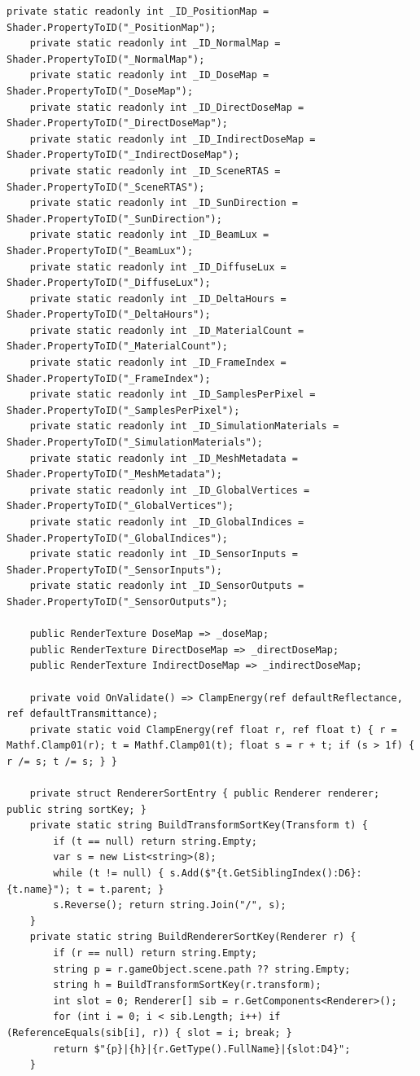 \begin{lstlisting}[language={[Sharp]C}, caption={IrradianceBaker.cs: Orchestrates the hardware-accelerated DXR raytracing passes.}, label={lst:irradiancebaker}]
    private static readonly int _ID_PositionMap = Shader.PropertyToID("_PositionMap");
    private static readonly int _ID_NormalMap = Shader.PropertyToID("_NormalMap");
    private static readonly int _ID_DoseMap = Shader.PropertyToID("_DoseMap");
    private static readonly int _ID_DirectDoseMap = Shader.PropertyToID("_DirectDoseMap");
    private static readonly int _ID_IndirectDoseMap = Shader.PropertyToID("_IndirectDoseMap");
    private static readonly int _ID_SceneRTAS = Shader.PropertyToID("_SceneRTAS");
    private static readonly int _ID_SunDirection = Shader.PropertyToID("_SunDirection");
    private static readonly int _ID_BeamLux = Shader.PropertyToID("_BeamLux");
    private static readonly int _ID_DiffuseLux = Shader.PropertyToID("_DiffuseLux");
    private static readonly int _ID_DeltaHours = Shader.PropertyToID("_DeltaHours");
    private static readonly int _ID_MaterialCount = Shader.PropertyToID("_MaterialCount");
    private static readonly int _ID_FrameIndex = Shader.PropertyToID("_FrameIndex");
    private static readonly int _ID_SamplesPerPixel = Shader.PropertyToID("_SamplesPerPixel");
    private static readonly int _ID_SimulationMaterials = Shader.PropertyToID("_SimulationMaterials");
    private static readonly int _ID_MeshMetadata = Shader.PropertyToID("_MeshMetadata");
    private static readonly int _ID_GlobalVertices = Shader.PropertyToID("_GlobalVertices");
    private static readonly int _ID_GlobalIndices = Shader.PropertyToID("_GlobalIndices");
    private static readonly int _ID_SensorInputs = Shader.PropertyToID("_SensorInputs");
    private static readonly int _ID_SensorOutputs = Shader.PropertyToID("_SensorOutputs");

    public RenderTexture DoseMap => _doseMap;
    public RenderTexture DirectDoseMap => _directDoseMap;
    public RenderTexture IndirectDoseMap => _indirectDoseMap;

    private void OnValidate() => ClampEnergy(ref defaultReflectance, ref defaultTransmittance);
    private static void ClampEnergy(ref float r, ref float t) { r = Mathf.Clamp01(r); t = Mathf.Clamp01(t); float s = r + t; if (s > 1f) { r /= s; t /= s; } }

    private struct RendererSortEntry { public Renderer renderer; public string sortKey; }
    private static string BuildTransformSortKey(Transform t) {
        if (t == null) return string.Empty;
        var s = new List<string>(8);
        while (t != null) { s.Add($"{t.GetSiblingIndex():D6}:{t.name}"); t = t.parent; }
        s.Reverse(); return string.Join("/", s);
    }
    private static string BuildRendererSortKey(Renderer r) {
        if (r == null) return string.Empty;
        string p = r.gameObject.scene.path ?? string.Empty;
        string h = BuildTransformSortKey(r.transform);
        int slot = 0; Renderer[] sib = r.GetComponents<Renderer>();
        for (int i = 0; i < sib.Length; i++) if (ReferenceEquals(sib[i], r)) { slot = i; break; }
        return $"{p}|{h}|{r.GetType().FullName}|{slot:D4}";
    }


\end{lstlisting}

